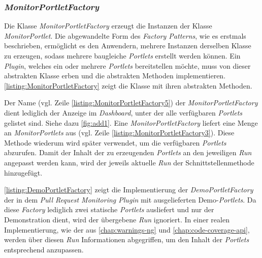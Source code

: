 \subsubsection{\textit{MonitorPortletFactory}}

Die Klasse \textit{MonitorPortletFactory} erzeugt die Instanzen der Klasse \textit{MonitorPortlet}. Die abgewandelte Form des \textit{Factory Patterns}, wie es erstmals \citet{gamma_helm_johnson_1998} beschrieben, ermöglicht es den Anwendern, mehrere Instanzen derselben Klasse zu erzeugen, sodass mehrere baugleiche \textit{Portlets} erstellt werden können. Ein \textit{Plugin}, welches ein oder mehrere \textit{Portlets} bereitstellen möchte, muss von dieser abstrakten Klasse erben und die abstrakten Methoden implementieren. \autoref{listing:MonitorPortletFactory} zeigt die Klasse mit ihren abstrakten Methoden.



Der Name (vgl. Zeile \autoref{listing:MonitorPortletFactory5}) der \textit{MonitorPortletFactory} dient lediglich der Anzeige im \textit{Dashboard}, unter der alle verfügbaren \textit{Portlets} gelistet sind. Siehe dazu \autoref{fig:add1}.
Eine \textit{MonitorPortletFactory} liefert eine Menge an \textit{MonitorPortlets} aus (vgl. Zeile \autoref{listing:MonitorPortletFactory3}). Diese Methode wiederum wird später verwendet, um die verfügbaren \textit{Portlets} abzurufen. Damit der Inhalt der zu erzeugenden \textit{Portlets} an den jeweiligen \textit{Run} angepasst werden kann, wird der jeweils aktuelle \textit{Run} der Schnittstellenmethode hinzugefügt. 

\autoref{listing:DemoPortletFactory} zeigt die Implementierung der \textit{DemoPortletFactory} der in dem \textit{Pull Request Monitoring Plugin} mit ausgelieferten Demo-\textit{Portlets}. Da diese \textit{Factory} lediglich zwei statische \textit{Portlets} ausliefert und nur der Demonstration dient, wird der übergebene \textit{Run} ignoriert. In einer realen Implementierung, wie der aus \autoref{chap:warnings-ng} und \autoref{chap:code-coverage-api}, werden über diesen \textit{Run} Informationen abgegriffen, um den Inhalt der \textit{Portlets} entsprechend anzupassen.




